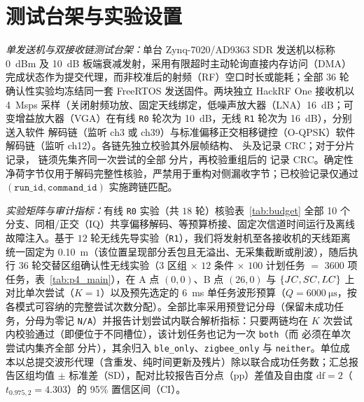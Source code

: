 \section{测试台架与实验设置}\label{sec:methodology}

\emph{单发送机与双接收链测试台架：}单台 Zynq-7020/AD9363 SDR 发送机以标称 \SI{0}{dBm} 及 \SI{10}{dB} 板端衰减发射，采用有限超时主动轮询直接内存访问（DMA）完成状态作为提交代理，而非校准后的射频（RF）空口时长或能耗；全部 36 轮确认性实验均冻结同一套 FreeRTOS \proto{} 发送固件。两块独立 HackRF One 接收机以 \SI{4}{Msps} 采样（关闭射频功放、固定天线绑定，低噪声放大器（LNA）\SI{16}{dB}；可变增益放大器（VGA）在有线 \texttt{R0} 轮次为 \SI{10}{dB}，无线 \texttt{R1} 轮次为 \SI{16}{dB}），分别送入软件 \ble{} 解码链（监听 \ble{} ch3 或 ch39）与标准偏移正交相移键控（O-QPSK）软件解码链（监听 \stdfour{} ch12）。各链先独立校验其外层帧结构、\proto{} 头及记录 CRC；对于分片 \modelc{} 记录，\ble{} 链须先集齐同一次尝试的全部 \fragproto{} 分片，再校验重组后的 \proto{} 记录 CRC。确定性净荷字节仅用于解码完整性核验，严禁用于重构对侧漏收字节；已校验记录仅通过 $(\texttt{run\_id},\texttt{command\_id})$ 实施跨链匹配。



\emph{实验矩阵与审计指标：}有线 \texttt{R0} 实验（共 $18$ 轮）核验表~\ref{tab:budget} 全部 10 个分支、同相/正交（IQ）共享偏移解码、等预算桥接、固定次信道时间运行及离线故障注入。基于 $12$ 轮无线先导实验（\texttt{R1}），我们将发射机至各接收机的天线距离统一固定为 \SI{0.10}{m}（该位置呈现部分丢包且无溢出、无采集截断或削波），随后执行 $36$ 轮交替区组确认性无线实验（$3$ 区组 $\times$ $12$ 条件 $\times$ $100$ 计划任务 $=$ \num{3600} 项任务，表~\ref{tab:p4_main}），在 A 点 $(0,0)$、B 点 $(26,0)$ 与 $\{JC{},SC{},LC{}\}$ 上对比单次尝试（$K{=}1$）以及预先选定的 \SI{6}{ms} 单任务波形预算（$Q{=}\SI{6000}{\micro\second}$，按各模式可容纳的完整尝试次数分配）。全部比率采用预登记分母（保留未成功任务，分母为零记 \texttt{N/A}）并报告计划尝试内联合解析指标：只要两链均在 $K$ 次尝试内校验通过（即便位于不同槽位），该计划任务也记为一次 \texttt{both}（而 \modelc{} 必须在单次尝试内集齐全部 \fragproto{} 分片），其余归入 \texttt{ble\_only}、\texttt{zigbee\_only} 与 \texttt{neither}。单位成本以总提交波形代理（含重发、纯时间更新及残片）除以联合成功任务数；汇总报告区组均值 $\pm$ 标准差（SD），配对比较报告百分点（pp）差值及自由度 $\text{df}{=}2$（$t_{0.975,2}{=}4.303$）的 95\% 置信区间（CI）。
